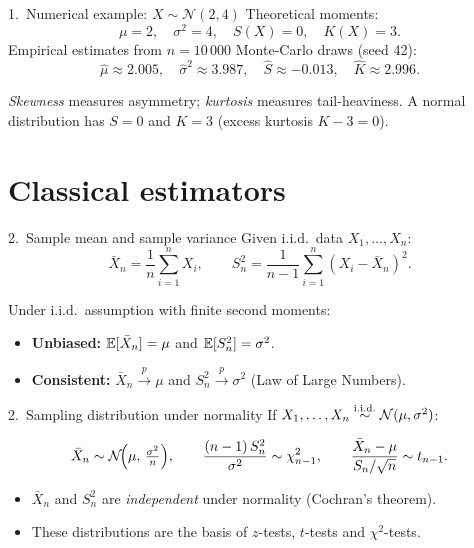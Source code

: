 \documentclass[aspectratio=169]{beamer}
\begin{document}
\begin{frame}{1.~Numerical example: $X \sim \mathcal{N}(2, 4)$}
  Theoretical moments:
  \[
    \mu = 2, \quad \sigma^2 = 4, \quad S(X) = 0, \quad K(X) = 3.
  \]
  \medskip
  Empirical estimates from $n = 10\,000$ Monte-Carlo draws (seed 42):
  \[
    \widehat{\mu} \approx 2.005, \quad
    \widehat{\sigma}^2 \approx 3.987, \quad
    \widehat{S} \approx -0.013, \quad
    \widehat{K} \approx 2.996.
  \]
  \medskip
  \begin{infobox}
    \emph{Skewness} measures asymmetry; \emph{kurtosis} measures
    tail-heaviness. A normal distribution has $S = 0$ and $K = 3$
    (excess kurtosis $K - 3 = 0$).
  \end{infobox}
\end{frame}

\section{Classical estimators}

\begin{frame}{2.~Sample mean and sample variance}
  Given i.i.d.\ data $X_1, \dots, X_n$:
  \[
    \bar{X}_n = \frac{1}{n}\sum_{i=1}^{n} X_i,
    \qquad
    S_n^2 = \frac{1}{n-1}\sum_{i=1}^{n}(X_i - \bar{X}_n)^2.
  \]
  \medskip
  \begin{propbox}[Properties]
    Under i.i.d.\ assumption with finite second moments:
    \begin{itemize}
      \item \textbf{Unbiased:} $\mathbb{E}[\bar{X}_n] = \mu$ and $\mathbb{E}[S_n^2] = \sigma^2$.
      \item \textbf{Consistent:} $\bar{X}_n \xrightarrow{p} \mu$
            and $S_n^2 \xrightarrow{p} \sigma^2$ (Law of Large Numbers).
    \end{itemize}
  \end{propbox}
\end{frame}

\begin{frame}{2.~Sampling distribution under normality}
  If $X_1, \dots, X_n \overset{\text{i.i.d.}}{\sim} \mathcal{N}(\mu, \sigma^2)$:
  \begin{thbox}
    \[
      \bar{X}_n \sim \mathcal{N}\!\Bigl(\mu,\, \tfrac{\sigma^2}{n}\Bigr),
      \qquad
      \frac{(n-1)\, S_n^2}{\sigma^2} \sim \chi^2_{n-1},
      \qquad
      \frac{\bar{X}_n - \mu}{S_n / \sqrt{n}} \sim t_{n-1}.
    \]
  \end{thbox}
  \medskip
  \begin{itemize}
    \item $\bar{X}_n$ and $S_n^2$ are \emph{independent} under normality
          (Cochran's theorem).
    \item These distributions are the basis of $z$-tests, $t$-tests
          and $\chi^2$-tests.
  \end{itemize}
\end{frame}
\end{document}
